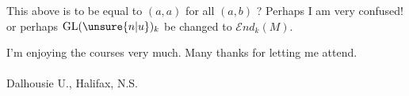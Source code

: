 This above is to be equal to $(a,a)$ for all $(a,b)$ ? Perhaps I am very confused! or perhaps $\mathrm{GL}(\unsure{n|u})_k$  be changed to $\mathcal E\mathit{nd}_k(M)$.

I'm enjoying the courses very much. Many thanks for letting me attend.\\
\hfill{} \\
\hfill Dalhousie U., Halifax, N.S.\\
\clearpage

